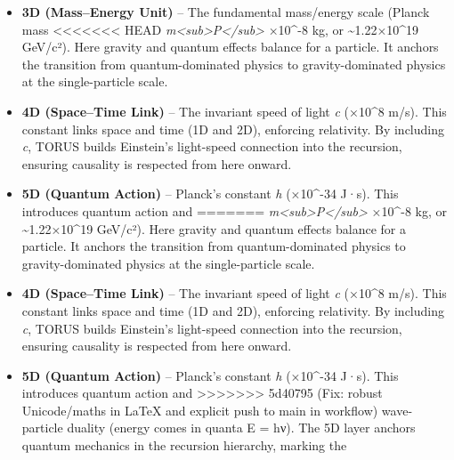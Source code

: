 \documentclass[]{article}
\begin{document}
{\begin{itemize}
  related to
  \emph{t\textless{}sub\textgreater{}P\textless{}/sub\textgreater{}} by
  the speed of light
  (\ell\textless{}sub\textgreater{}P\textless{}/sub\textgreater{} =
  \emph{c}·t\textless{}sub\textgreater{}P\textless{}/sub\textgreater{},
>>>>>>> 5d40795 (Fix: robust Unicode/maths in LaTeX and explicit push to main in workflow)
  ensuring consistent space-time units).
\item
  \textbf{3D (Mass--Energy Unit)} -- The fundamental mass/energy scale
  (Planck mass
<<<<<<< HEAD
  \emph{m\textless sub\textgreater P\textless/sub\textgreater{}} ×10\^{}-8 kg, or \textasciitilde1.22×10\^{}19
  GeV/c²)\hspace{0pt}. Here gravity and quantum effects balance for a
  particle. It anchors the transition from quantum-dominated physics to
  gravity-dominated physics at the single-particle scale.
\item
  \textbf{4D (Space--Time Link)} -- The invariant speed of light
  \emph{c} (×10\^{}8 m/s)\hspace{0pt}. This constant links space
  and time (1D and 2D), enforcing relativity. By including \emph{c},
  TORUS builds Einstein's light-speed connection into the recursion,
  ensuring causality is respected from here onward.
\item
  \textbf{5D (Quantum Action)} -- Planck's constant \emph{h} (×10\^{}-34 J·s)\hspace{0pt}. This introduces quantum action and
=======
  \emph{m\textless{}sub\textgreater{}P\textless{}/sub\textgreater{}} ×10\^{}-8 kg, or \textasciitilde{}1.22×10\^{}19 GeV/c²)​. Here
  gravity and quantum effects balance for a particle. It anchors the
  transition from quantum-dominated physics to gravity-dominated physics
  at the single-particle scale.
\item
  \textbf{4D (Space--Time Link)} -- The invariant speed of light
  \emph{c} (×10\^{}8 m/s)​. This constant links space and time (1D
  and 2D), enforcing relativity. By including \emph{c}, TORUS builds
  Einstein's light-speed connection into the recursion, ensuring
  causality is respected from here onward.
\item
  \textbf{5D (Quantum Action)} -- Planck's constant \emph{h} (×10\^{}-34 J·s)​. This introduces quantum action and
>>>>>>> 5d40795 (Fix: robust Unicode/maths in LaTeX and explicit push to main in workflow)
  wave-particle duality (energy comes in quanta E = hν). The 5D layer
  anchors quantum mechanics in the recursion hierarchy, marking the

\end{itemize}}
\end{document}
